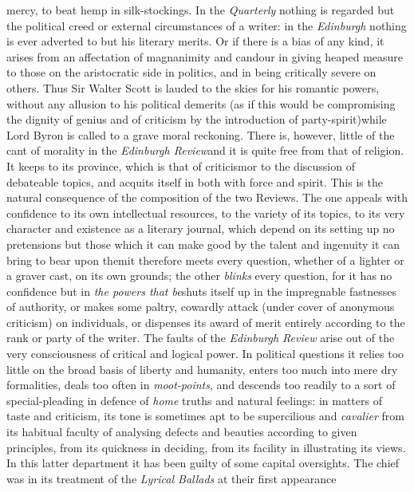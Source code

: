 mercy, to beat hemp in silk-stockings. In the \emph{Quarterly}
nothing is regarded but the political creed or external
circumstances of a writer: in the \emph{Edinburgh} nothing is ever
adverted to but his literary merits. Or if there is a bias of any
kind, it arises from an affectation of magnanimity and candour in
giving heaped measure to those on the aristocratic side in
politics, and in being critically severe on others. Thus Sir
Walter Scott is lauded to the skies for his romantic powers,
without any allusion to his political demerits (as if this would
be compromising the dignity of genius and of criticism by the
introduction of party-spirit)\textemdash while Lord Byron is
called to a grave moral reckoning. There is, however, little of
the cant of morality in the \emph{Edinburgh Review}\textemdash and
it is quite free from that of religion. It keeps to its province,
which is that of criticism\textemdash or to the discussion of
debateable topics, and acquits itself in both with force and
spirit.  This is the natural consequence of the composition of the
two Reviews.  The one appeals with confidence to its own
intellectual resources, to the variety of its topics, to its very
character and existence as a literary journal, which depend on its
setting up no pretensions but those which it can make good by the
talent and ingenuity it can bring to bear upon them\textemdash it
therefore meets every question, whether of a lighter or a graver
cast, on its own grounds; the other \emph{blinks} every question,
for it has no confidence but in \emph{the powers that
  be}\textemdash shuts itself up in the impregnable fastnesses of
authority, or makes some paltry, cowardly attack (under cover of
anonymous criticism) on individuals, or dispenses its award of
merit entirely according to the rank or party of the writer. The
faults of the \emph{Edinburgh Review} arise out of the very
consciousness of critical and logical power. In political
questions it relies too little on the broad basis of liberty and
humanity, enters too much into mere dry formalities, deals too
often in \emph{moot-points}, and descends too readily to a sort of
special-pleading in defence of \emph{home} truths and natural
feelings: in matters of taste and criticism, its tone is sometimes
apt to be supercilious and \emph{cavalier} from its habitual
faculty of analysing defects and beauties according to given
principles, from its quickness in deciding, from its facility in
illustrating its views. In this latter department it has been
guilty of some capital oversights. The chief was in its treatment
of the \emph{Lyrical Ballads} at their first appearance\textemdash
